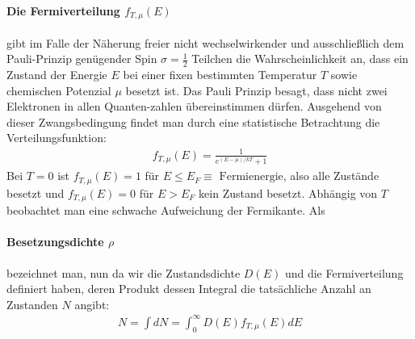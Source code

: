 \documentclass[twoside,        %
               BCOR12mm,       %
               english,ngerman, %
               fleqn,headsepline=false,footsepline=false
              ]{MFPREPORT}
\begin{document}
\paragraph{Die Fermiverteilung $f_{T,\mu}(E)$} gibt im Falle der Näherung freier nicht wechselwirkender und ausschließlich dem Pauli-Prinzip genügender Spin $\sigma = \frac{1}{2}$ Teilchen die Wahrscheinlichkeit an, dass ein Zustand der Energie $E$ bei einer fixen bestimmten Temperatur $T$ sowie chemischen Potenzial $\mu$ besetzt ist. 
Das Pauli Prinzip besagt, dass nicht zwei Elektronen in allen Quanten-zahlen übereinstimmen dürfen. Ausgehend von dieser Zwangsbedingung findet man durch eine statistische Betrachtung die Verteilungsfunktion:
\begin{align}
f_{T, \mu} (E)={\frac {1}{e^{(E-\mu )/kT}+1}}
\end{align}
Bei $T=0$ ist $f_{T,\mu}(E)=1$ für $E \leq E_{F} \equiv \text{ Fermienergie}$, also alle Zustände besetzt und $f_{T,\mu}(E)=0$ für $E > E_{F} $ kein Zustand besetzt. 
Abhängig von $T$ beobachtet man eine schwache Aufweichung der Fermikante. 
Als \paragraph{Besetzungsdichte $\rho$} bezeichnet man, nun da wir die Zustandsdichte $D(E)$ und die Fermiverteilung definiert haben, deren Produkt dessen Integral die tatsächliche Anzahl an Zustanden $N$ angibt:
\begin{align}
N = \int dN = \int_{0}^{\infty} D(E) f_{T,\mu} (E) dE
\end{align}
 
\end{document}
